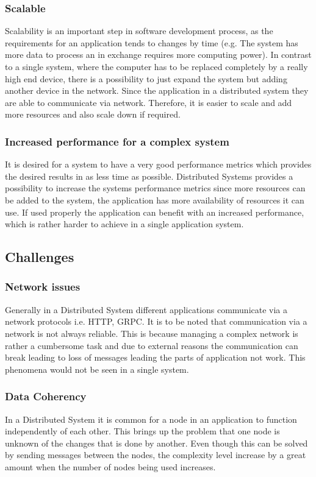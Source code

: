         \subsubsection{Scalable}
        Scalability is an important step in software development process, as the requirements for an application tends to changes by time 
        (e.g. The system has more data to process an in exchange requires more computing power). In contrast to a single system, where the computer 
        has to be replaced completely by a really high end device, there is a possibility to just expand the system but adding another device in the network.
        Since the application in a distributed system they are able to communicate via network. Therefore, it is easier to scale and add more resources and 
        also scale down if required. 

        \subsubsection{Increased performance for a complex system}
        It is desired for a system to have a very good performance metrics which provides the desired results in as less time as possible.
        Distributed Systems provides a possibility to increase the systems performance metrics since more resources can be added to the system,
        the application has more availability of resources it can use. If used properly the application can benefit with an increased performance, 
        which is rather harder to achieve in a single application system.
    
    \subsection{Challenges}    

        \subsubsection{Network issues}
        Generally in a Distributed System different applications communicate via a network protocols i.e. HTTP, GRPC. It is to be noted that
        communication via a network is not always reliable. This is because managing a complex network is rather a cumbersome task and due to
        external reasons the communication can break leading to loss of messages leading the parts of application not work. This phenomena would not be
        seen in a single system.

        \subsubsection{Data Coherency}
        In a Distributed System it is common for a node in an application to function independently of each other. This brings up the problem that
        one node is unknown of the changes that is done by another. Even though this can be solved by sending messages between the nodes, the complexity
        level increase by a great amount when the number of nodes being used increases.

        \subsubsection{}
         
